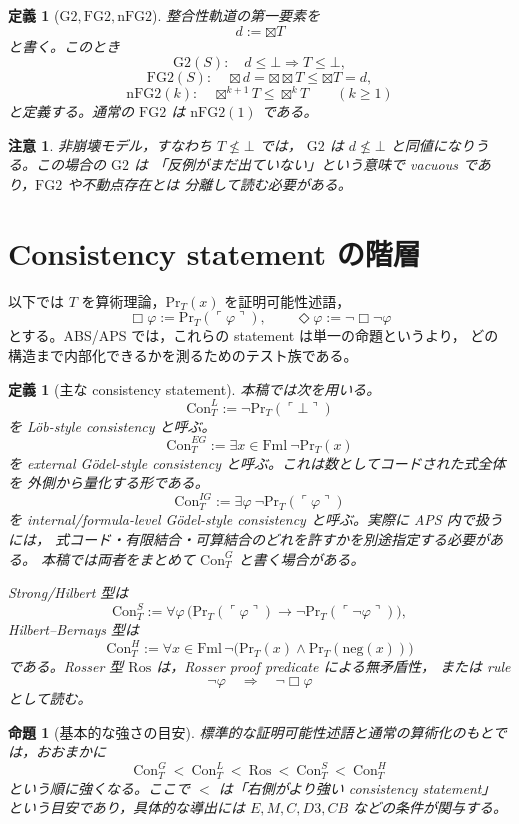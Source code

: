 ﻿\documentclass[a4paper,10pt]{ltjsarticle}
\newtheorem{proposition}[theorem]{命題}
\newtheorem{definition}[theorem]{定義}
\newtheorem{remark}[theorem]{注意}
\newcommand{\Gtwo}{\mathrm{G2}}
\newcommand{\FGtwo}{\mathrm{FG2}}
\newcommand{\nFGtwo}{\mathrm{nFG2}}
\newcommand{\Con}{\mathrm{Con}}
\newcommand{\Ros}{\mathrm{Ros}}
\newcommand{\Boxop}{\Box}
\newcommand{\Btx}{\boxtimes}
\newcommand{\Dia}{\Diamond}
\newcommand{\PrT}{\mathrm{Pr}_T}
\newcommand{\Fml}{\mathrm{Fml}}
\newcommand{\Top}{T}
\newcommand{\Bot}{\bot}
\begin{document}
\begin{definition}[\(\Gtwo,\FGtwo,\nFGtwo\)]
整合性軌道の第一要素を
\[
d:=\Btx\Top
\]
と書く。このとき
\[
\Gtwo(S):\quad d\le\Bot\Rightarrow \Top\le\Bot,
\]
\[
\FGtwo(S):\quad \Btx d=\Btx\Btx\Top\le \Btx\Top=d,
\]
\[
\nFGtwo(k):\quad \Btx^{k+1}\Top\le \Btx^k\Top\qquad(k\ge1)
\]
と定義する。通常の \(\FGtwo\) は \(\nFGtwo(1)\) である。
\end{definition}

\begin{remark}
非崩壊モデル，すなわち \(\Top\not\le\Bot\) では，
\(\Gtwo\) は \(d\not\le\Bot\) と同値になりうる。この場合の \(\Gtwo\) は
「反例がまだ出ていない」という意味で vacuous であり，\(\FGtwo\) や不動点存在とは
分離して読む必要がある。
\end{remark}

\section{Consistency statement の階層}

以下では \(T\) を算術理論，\(\PrT(x)\) を証明可能性述語，
\[
\Boxop\varphi:=\PrT(\ulcorner\varphi\urcorner),\qquad
\Dia\varphi:=\neg\Boxop\neg\varphi
\]
とする。ABS/APS では，これらの statement は単一の命題というより，
どの構造まで内部化できるかを測るためのテスト族である。

\begin{definition}[主な consistency statement]
本稿では次を用いる。
\[
\Con_T^L:=\neg\PrT(\ulcorner\Bot\urcorner)
\]
を Löb-style consistency と呼ぶ。
\[
\Con_T^{EG}:=\exists x\in\Fml\ \neg\PrT(x)
\]
を external Gödel-style consistency と呼ぶ。これは数としてコードされた式全体を
外側から量化する形である。
\[
\Con_T^{IG}:=\exists \varphi\ \neg\PrT(\ulcorner\varphi\urcorner)
\]
を internal/formula-level Gödel-style consistency と呼ぶ。実際に APS 内で扱うには，
式コード・有限結合・可算結合のどれを許すかを別途指定する必要がある。
本稿では両者をまとめて \(\Con_T^G\) と書く場合がある。

Strong/Hilbert 型は
\[
\Con_T^S:=\forall\varphi\,
\bigl(\PrT(\ulcorner\varphi\urcorner)
\to
\neg\PrT(\ulcorner\neg\varphi\urcorner)\bigr),
\]
Hilbert--Bernays 型は
\[
\Con_T^H:=\forall x\in\Fml\,
\neg\bigl(\PrT(x)\land\PrT(\mathrm{neg}(x))\bigr)
\]
である。Rosser 型 \(\Ros\) は，Rosser proof predicate による無矛盾性，
または rule
\[
\neg\varphi\quad\Longrightarrow\quad \neg\Boxop\varphi
\]
として読む。
\end{definition}

\begin{proposition}[基本的な強さの目安]
標準的な証明可能性述語と通常の算術化のもとでは，おおまかに
\[
\Con_T^G
\ <\
\Con_T^L
\ <\
\Ros
\ <\
\Con_T^S
\ <\
\Con_T^H
\]
という順に強くなる。ここで \(<\) は「右側がより強い consistency statement」
という目安であり，具体的な導出には \(E,M,C,D3,CB\) などの条件が関与する。
\end{proposition}
\end{document}
